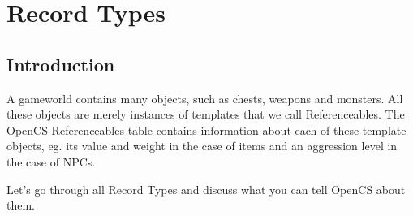 \section{Record Types}

\subsection{Introduction}
A gameworld contains many objects, such as chests, weapons and monsters. All these objects are merely instances of templates that we call Referenceables. The OpenCS Referenceables table contains information about each of these template objects, eg. its value and weight in the case of items and an aggression level in the case of NPCs.

Let's go through all Record Types and discuss what you can tell OpenCS about them.

